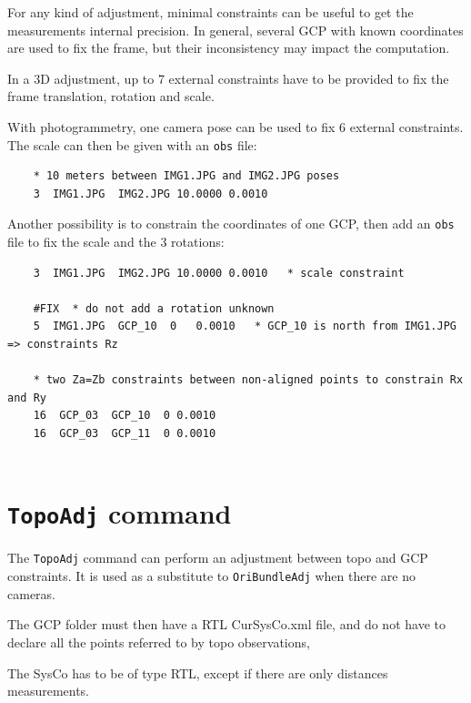 For any kind of adjustment, minimal constraints can be useful to get the measurements internal precision.
In general, several GCP with known coordinates are used to fix the frame, but their inconsistency may
impact the computation.

In a 3D adjustment, up to 7 external constraints have to be provided to fix the frame translation, rotation and scale.

With photogrammetry, one camera pose can be used to fix 6 external constraints. The scale can then be given with an {\tt obs} file:
\begin{verbatim}
    * 10 meters between IMG1.JPG and IMG2.JPG poses
    3  IMG1.JPG  IMG2.JPG 10.0000 0.0010   
\end{verbatim}

Another possibility is to constrain the coordinates of one GCP, then add an {\tt obs} file to fix the scale and the 3 rotations:
\begin{verbatim}
    3  IMG1.JPG  IMG2.JPG 10.0000 0.0010   * scale constraint

    #FIX  * do not add a rotation unknown
    5  IMG1.JPG  GCP_10  0   0.0010   * GCP_10 is north from IMG1.JPG => constraints Rz

    * two Za=Zb constraints between non-aligned points to constrain Rx and Ry
    16  GCP_03  GCP_10  0 0.0010
    16  GCP_03  GCP_11  0 0.0010
    
\end{verbatim}


\section{\texttt{TopoAdj} command}
\label{sec:TopoAdj}

The {\tt TopoAdj} command can perform an adjustment between topo and GCP constraints.
It is used as a substitute to {\tt OriBundleAdj} when there are no cameras.

The GCP folder must then have a RTL CurSysCo.xml file, and do not have to declare all the points
referred to by topo observations, 

The SysCo has to be of type RTL, except if there are only distances measurements.

